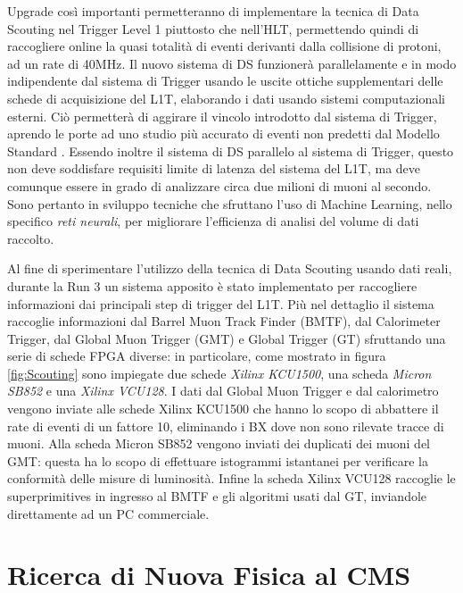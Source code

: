 Upgrade così importanti permetteranno di implementare la tecnica di Data Scouting nel Trigger Level 1 piuttosto che nell'HLT, permettendo quindi di raccogliere online la quasi totalità di eventi derivanti dalla collisione di protoni, ad un rate di 40MHz. Il nuovo sistema di DS funzionerà parallelamente e in modo indipendente dal sistema di Trigger usando le uscite ottiche supplementari delle schede di acquisizione del L1T, elaborando i dati usando sistemi computazionali esterni. Ciò permetterà di aggirare il vincolo introdotto dal sistema di Trigger, aprendo le porte ad uno studio più accurato di eventi non predetti dal Modello Standard \cite{MasterThesisNicLai}. Essendo inoltre il sistema di DS parallelo al sistema di Trigger, questo non deve soddisfare requisiti limite di latenza del sistema del L1T, ma deve comunque essere in grado di analizzare circa due milioni di muoni al secondo. Sono pertanto in sviluppo tecniche che sfruttano l'uso di Machine Learning, nello specifico \textit{reti neurali}, per migliorare l'efficienza di analisi del volume di dati raccolto.

Al fine di sperimentare l'utilizzo della tecnica di Data Scouting usando dati reali, durante la Run 3 un sistema apposito è stato implementato per raccogliere informazioni dai principali step di trigger del L1T. Più nel dettaglio il sistema raccoglie informazioni dal Barrel Muon Track Finder (BMTF), dal Calorimeter Trigger, dal Global Muon Trigger (GMT) e Global Trigger (GT) sfruttando una serie di schede FPGA diverse: in particolare, come mostrato in figura \ref{fig:Scouting} sono impiegate due schede \textit{Xilinx KCU1500}, una scheda \textit{Micron SB852} e una \textit{Xilinx VCU128}. \newline
I dati dal Global Muon Trigger e dal calorimetro vengono inviate alle schede Xilinx KCU1500 che hanno lo scopo di abbattere il rate di eventi di un fattore 10, eliminando i BX dove non sono rilevate tracce di muoni. Alla scheda Micron SB852 vengono inviati dei duplicati dei muoni del GMT: questa ha lo scopo di effettuare istogrammi istantanei per verificare la conformità delle misure di luminosità. Infine la scheda Xilinx VCU128 raccoglie le superprimitives in ingresso al BMTF e gli algoritmi usati dal GT, inviandole direttamente ad un PC commerciale.






\section{Ricerca di Nuova Fisica al CMS}
\label{sec:NewPhysics}

